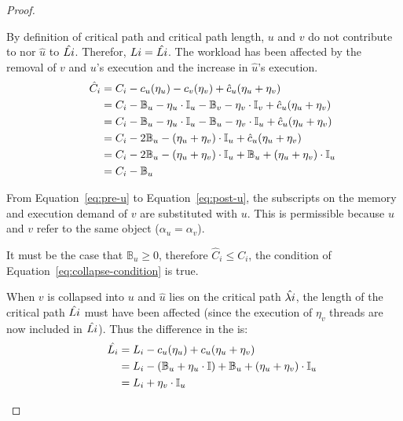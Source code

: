 \begin{theorem}
\begin{proof}
    \begin{case} By
      definition of critical path and critical path length, ${u}$ and
      ${v}$ do not contribute to  nor ${\hat{u}}$ to
      ${\hat{L{i}}}$. Therefor,
      ${L{i} = \hat{L{i}}}$. The
      workload has been affected by the removal of ${v}$ and ${u}$'s execution
      and the increase in ${\hat{u}}$'s execution. 
      \begin{align}
        \indent
        \hat{C}_i &= C_i - c_u(\eta_u) - c_v(\eta_v) +
        \hat{c}_u(\eta_u + \eta_v) \\
        &= C_i - \mathbb{B}_u - \eta_u \cdot \mathbb{I}_u
            - \mathbb{B}_v - \eta_v \cdot \mathbb{I}_v +
            \hat{c}_u(\eta_u + \eta_v)
            \label{eq:pre-u} \\
        &= C_i - \mathbb{B}_u - \eta_u \cdot \mathbb{I}_u
            - \mathbb{B}_u - \eta_v \cdot \mathbb{I}_u +
            \hat{c}_u(\eta_u + \eta_v)
            \label{eq:post-u} \\
        &= C_i -2\mathbb{B}_u - (\eta_u + \eta_v)\cdot \mathbb{I}_u +
            \hat{c}_u(\eta_u + \eta_v) \\
        &= C_i -2\mathbb{B}_u - (\eta_u + \eta_v)\cdot \mathbb{I}_u +
            \mathbb{B}_u + (\eta_u + \eta_v)\cdot \mathbb{I}_u \\
        &= C_i - \mathbb{B}_u
      \end{align}

      From Equation~\ref{eq:pre-u} to Equation~\ref{eq:post-u}, the
      subscripts on the memory and execution demand of ${v}$ are
      substituted with ${u}$. This is permissible because ${u}$ and
      ${v}$ refer to the same object (${\alpha_u = \alpha_v}$).

      It must be the case that ${\mathbb{B}_u \ge 0}$, therefore
      ${\hat{C}_i \le C_i}$, the condition of
      Equation~\ref{eq:collapse-condition} is true.
    \end{case}

    \begin{case} When ${v}$ is
      collapsed into ${u}$ and ${\hat{u}}$ lies on the critical path
      ${\hat{\lambda{i}}}$, the length of the critical path
      ${\hat{L{i}}}$ must have been affected (since the
      execution of ${\eta_v}$ threads are now included in
      ${\hat{L{i}}}$). Thus the difference in the
       is:
      \begin{align*}
        \indent
        \hat{L_i} &= L_i - c_u(\eta_u) + c_u(\eta_u + \eta_v) \\
        &= L_i - (\mathbb{B}_u + \eta_u \cdot \mathbb{I}) +
            \mathbb{B}_u + (\eta_u + \eta_v) \cdot \mathbb{I}_u \\
        &= L_i + \eta_v \cdot \mathbb{I}_u
      \end{align*}



\end{case}
\end{proof}
\end{theorem}
